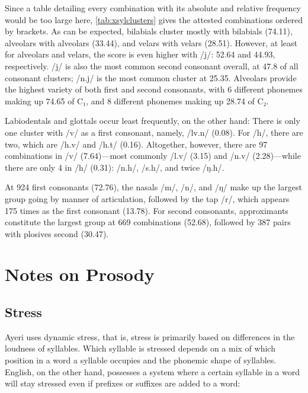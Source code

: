Since a table detailing every combination with its absolute and relative 
frequency would be too large here, \autoref{tab:xsylclusters} gives the 
attested combinations ordered by brackets. As can be expected, bilabials cluster 
mostly with bilabials (74.11\pct), alveolars with alveolars (33.44\pct), and 
velars with velars (28.51\pct). However, at least for alveolars and velars, the 
score is even higher with /j/: 52.64\pct{} and 44.93\pct{}, respectively. /j/ 
is also the most common second consonant overall, at 47.8\pct{} of all 
consonant clusters; /n.j/ is the most common cluster at 25.35\pct{}. Alveolars 
provide the highest variety of both first and second consonants, with 6 
different phonemes making up 74.65\pct{} of C₁, and 8 different phonemes making 
up 28.74\pct{} of C₂.

Labiodentals and glottals occur least frequently, on the other hand: There is 
only one cluster with /v/ as a first consonant, namely, /lv.n/ (0.08\pct). 
For /h/, there are two, which are /h.v/ and /h.t/ (0.16\pct). Altogether, 
however, there are 97 combinations in /v/ (7.64\pct)---most commonly /l.v/ 
(3.15\pct) and /n.v/ (2.28\pct)---while there are only 4 in /h/ (0.31\pct): 
/n.h/, /s.h/, and twice /ŋ.h/.

At 924 first consonants (72.76\pct), the nasals /m/, /n/, and /ŋ/ make up the 
largest group going by manner of articulation, followed by the tap /r/, which 
appears 175 times as the first consonant (13.78\pct). For second consonants, 
approximants constitute the largest group at 669 combinations (52.68\pct), 
followed by 387 pairs with plosives second (30.47\pct).

\section{Notes on Prosody}

\subsection{Stress}

Ayeri uses dynamic stress, that is, stress is primarily based on differences in 
the loudness of syllables. Which syllable is stressed depends on a mix of which 
position in a word a syllable occupies and the phonemic shape of syllables. 
English, on the other hand, possesses a system where a certain syllable in a 
word will stay stressed even if prefixes or suffixes are added to a word:

